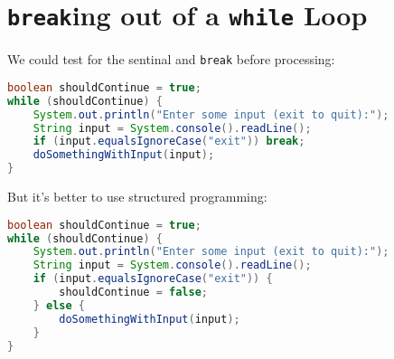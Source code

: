 \documentclass{article}
\begin{document}
\section{{\tt break}ing out of a {\tt while} Loop}

\vspace{-.05in}
We could test for the sentinal and {\tt break} before processing:
\vspace{-.05in}
\begin{lstlisting}[language=Java]
boolean shouldContinue = true;
while (shouldContinue) {
    System.out.println("Enter some input (exit to quit):");
    String input = System.console().readLine();
    if (input.equalsIgnoreCase("exit")) break;
    doSomethingWithInput(input);
}
\end{lstlisting}
\vspace{-.1in}
But it's better to use structured programming:
\vspace{-.05in}
\begin{lstlisting}[language=Java]
boolean shouldContinue = true;
while (shouldContinue) {
    System.out.println("Enter some input (exit to quit):");
    String input = System.console().readLine();
    if (input.equalsIgnoreCase("exit")) {
        shouldContinue = false;
    } else {
        doSomethingWithInput(input);
    }
}
\end{lstlisting}
\end{document}

